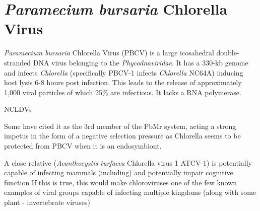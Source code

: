 %









\section{\textit{Paramecium bursaria} Chlorella Virus}

\textit{Paramecium bursaria} Chlorella Virus (PBCV) is a large icosahedral double-stranded DNA virus belonging to 
the \textit{Phycodnaviridae}.  It has a 330-kb genome and infects \textit{Chlorella} 
(specifically PBCV-1 infects \textit{Chlorella} NC64A) inducing host lysis 6-8 hours post infection.
This leads to the release of approximately 1,000 viral particles of which 25\% are infectious. 
It lacks a RNA polymerase. \citep{Yanai-Balser2010}

NCLDVs 

Some have cited it as the 3rd member of the PbMr system, acting a strong impetus in the form of a negative
selection pressure as Chlorella seems to be protected from PBCV when it is an endosymbiont.


A close relative (\textit{Acanthocystis turfacea} Chlorella virus 1 ATCV-1) is potentially capable of 
infecting mammals (including) and potentially impair cognitive function
If this is true, this would make chloroviruses one of the few known examples of viral groups capable of infecting 
multiple kingdoms (along with some plant - invertebrate viruses) \citep{Yolken2014}


